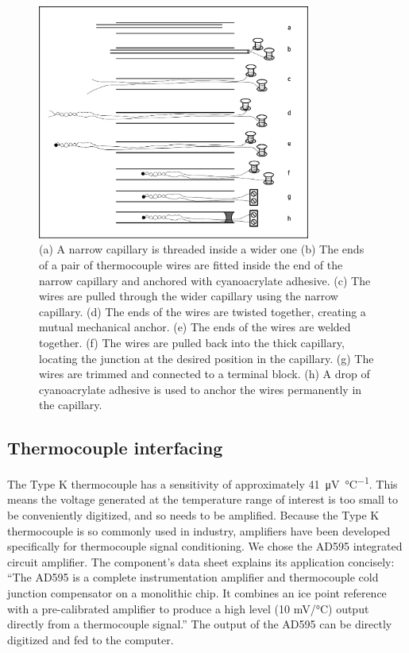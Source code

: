 \begin{figure}
	\centering
	\includegraphics[width=0.8\textwidth]{./Figures/FineWireThermocouple.pdf}
	\decoRule
	
\caption[A cartoon explaining how to construct a long, thin thermocouple
probe.]{(a) A narrow capillary is threaded inside a wider one (b) The ends of a
pair of thermocouple wires are fitted inside the end of the narrow capillary and
anchored with cyanoacrylate adhesive. (c) The wires are pulled through the
wider capillary using the narrow capillary. (d) The ends of the wires are twisted
together, creating a mutual mechanical anchor.
(e) The ends of the wires are welded together. (f) The wires are pulled back
into the thick capillary, locating the junction at the desired position in the
capillary. (g) The wires are trimmed and connected to a terminal block. (h) A
drop of cyanoacrylate adhesive is used to anchor the wires permanently in the
capillary. }
	
	\label{fig:FineWireThermocouple}
\end{figure}

\subsection{Thermocouple interfacing}

The Type K thermocouple has a sensitivity of approximately
\SI{41}{\micro\volt\per\celsius}. This means the voltage generated at the
temperature range of interest is too small to be conveniently digitized, and so
needs to be amplified. Because the Type K thermocouple is so commonly used in
industry, amplifiers have been developed specifically for thermocouple signal
conditioning. We chose the AD595 integrated circuit amplifier. The component's
data sheet explains its application concisely: ``The AD595 is a complete
instrumentation amplifier and thermocouple cold junction compensator on a
monolithic chip. It combines an ice point reference with a pre-calibrated
amplifier to produce a high level (10 mV/°C) output directly from a thermocouple
signal.'' \autocite{AD595} The output of the AD595 can be directly digitized and
fed to the computer.

